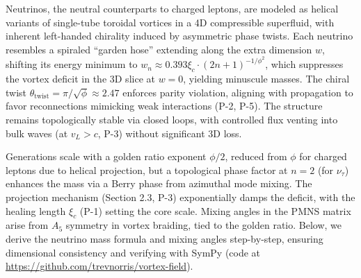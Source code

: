 Neutrinos, the neutral counterparts to charged leptons, are modeled as helical variants of single-tube toroidal vortices in a 4D compressible superfluid, with inherent left-handed chirality induced by asymmetric phase twists. Each neutrino resembles a spiraled ``garden hose'' extending along the extra dimension $w$, shifting its energy minimum to $w_n \approx 0.393 \xi_c \cdot (2n+1)^{-1/\phi^2}$, which suppresses the vortex deficit in the 3D slice at $w=0$, yielding minuscule masses. The chiral twist $\theta_{\text{twist}} = \pi / \sqrt{\phi} \approx 2.47$ enforces parity violation, aligning with propagation to favor reconnections mimicking weak interactions (P-2, P-5). The structure remains topologically stable via closed loops, with controlled flux venting into bulk waves (at $v_L > c$, P-3) without significant 3D loss.

Generations scale with a golden ratio exponent $\phi/2$, reduced from $\phi$ for charged leptons due to helical projection, but a topological phase factor at $n=2$ (for $\nu_\tau$) enhances the mass via a Berry phase from azimuthal mode mixing. The projection mechanism (Section 2.3, P-3) exponentially damps the deficit, with the healing length $\xi_c$ (P-1) setting the core scale. Mixing angles in the PMNS matrix arise from $A_5$ symmetry in vortex braiding, tied to the golden ratio. Below, we derive the neutrino mass formula and mixing angles step-by-step, ensuring dimensional consistency and verifying with SymPy (code at \url{https://github.com/trevnorris/vortex-field}).

